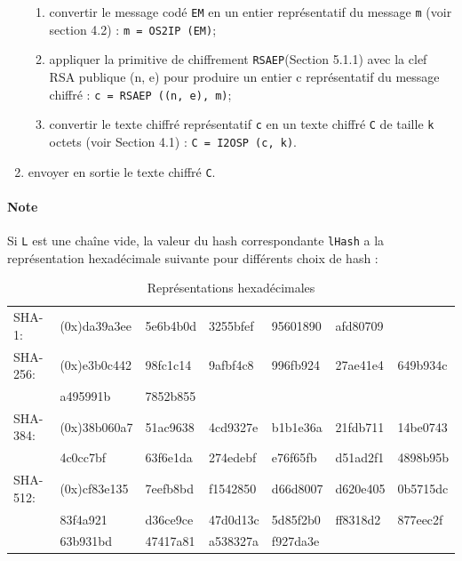 \begin{enumerate}
\begin{enumerate}
\item convertir le message codé \texttt{EM} en un entier représentatif du message \texttt{m} (voir section 4.2) : \texttt{m = OS2IP (EM)};
\item appliquer la primitive de chiffrement \texttt{RSAEP}(Section 5.1.1) avec la clef RSA publique (n, e) pour produire un entier c représentatif du message chiffré : \texttt{c = RSAEP ((n, e), m)};
\item convertir le texte chiffré représentatif \texttt{c} en un texte chiffré \texttt{C} de taille \texttt{k} octets (voir Section 4.1) : \texttt{C = I2OSP (c, k)}.\\
\end{enumerate}
\item envoyer en sortie le texte chiffré \texttt{C}.\\
\end{enumerate}
\paragraph{Note} Si \texttt{L} est une chaîne vide, la valeur du hash correspondante \texttt{lHash} a la représentation hexadécimale suivante pour différents choix de hash :


\begin{table}[H]
\centering
\begin{tabularx}{17cm}{Xllllll}
SHA-1: & (0x)da39a3ee & 5e6b4b0d & 3255bfef & 95601890 & afd80709 & \\
SHA-256: & (0x)e3b0c442 & 98fc1c14 & 9afbf4c8 & 996fb924 & 27ae41e4 & 649b934c\\
& a495991b & 7852b855 & & & &\\
SHA-384: & (0x)38b060a7 & 51ac9638 & 4cd9327e & b1b1e36a & 21fdb711 & 14be0743\\
& 4c0cc7bf & 63f6e1da & 274edebf & e76f65fb & d51ad2f1 & 4898b95b\\
SHA-512: & (0x)cf83e135 & 7eefb8bd & f1542850 & d66d8007 & d620e405 & 0b5715dc\\
& 83f4a921 & d36ce9ce & 47d0d13c & 5d85f2b0 & ff8318d2 & 877eec2f\\
& 63b931bd & 47417a81 & a538327a & f927da3e &	&\\
\end{tabularx}
\caption{Représentations hexadécimales}
\label{repres_hexa}
\end{table}


